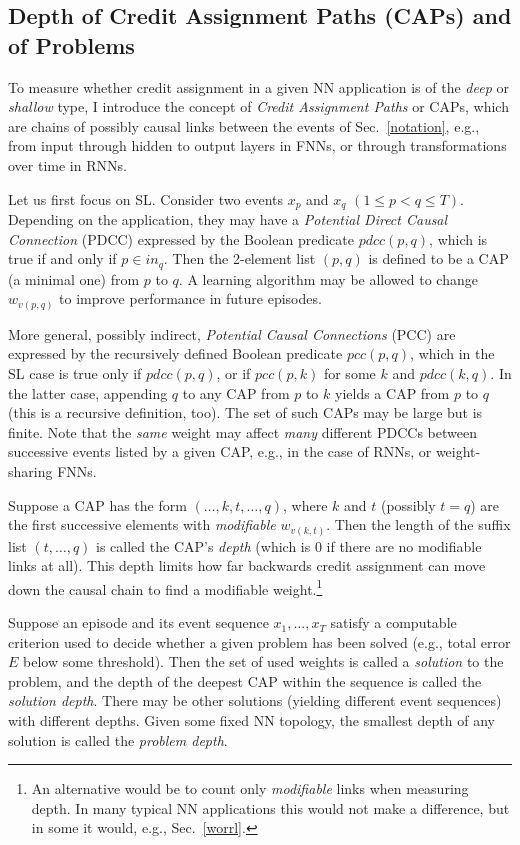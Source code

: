 \documentclass[letterpaper]{article}
\begin{document}
\begin{CJK*}{UTF8}{gbsn}


\section{Depth of Credit Assignment Paths (CAPs) and of Problems}
\label{caps}

To measure whether credit assignment in a given 
NN application is of the {\em deep} or {\em shallow} type,
I introduce the concept of {\em Credit Assignment Paths} or CAPs,
which are chains of possibly causal links between the events of Sec.~\ref{notation},
e.g., from input through hidden to output layers in FNNs, or through 
transformations over time in RNNs. 

Let us first focus on SL.
Consider two events 
$x_p$ and $x_q$ $(1 \leq p < q \leq T)$.
Depending on the application, they may have a
{\em Potential Direct Causal Connection} (PDCC) expressed by the Boolean
predicate $pdcc(p,q)$, which
is true if and only if $p \in in_q$.
Then the 2-element list $(p,q)$ is defined to be a CAP (a minimal one) from $p$ to $q$.
A learning algorithm may be allowed to change  $w_{v(p,q)}$ to improve performance
in future episodes.

More general, possibly indirect,
{\em Potential Causal Connections} (PCC) are expressed by the 
recursively defined Boolean
predicate $pcc(p,q)$, which in the SL case 
is true only if $pdcc(p,q)$, or if
$pcc(p,k)$ for some $k$ and $pdcc(k,q)$.
In the latter case,
appending $q$ to any CAP from $p$ to $k$ yields a CAP from $p$ to $q$
 (this is a recursive definition, too).
The set of such CAPs may be large but is finite. 
Note that the {\em same} weight may affect {\em many} different PDCCs
between successive events listed by a given CAP, 
e.g., in the case of RNNs, or weight-sharing FNNs.

Suppose a CAP has the form $(\ldots,k,t,\ldots,q)$, where
$k$ and $t$ (possibly $t=q$) are the first successive elements 
with {\em modifiable} $w_{v(k,t)}$. Then the 
length of the suffix list $(t,\ldots, q)$ is called the CAP's {\em depth}
(which is 0 if there are no modifiable links at all).
This depth limits how far backwards credit assignment 
can move down the causal chain 
to find a modifiable 
weight.\footnote{An alternative would be to count only {\em modifiable} links when measuring depth. In many 
typical NN applications this would not make a difference, but in some it would, e.g., Sec.~\ref{worrl}.}

Suppose an episode and its event sequence $x_1,\ldots,x_T$ satisfy a computable criterion 
used to decide whether a given problem has been solved 
(e.g., total error $E$ below some threshold). 
Then the set of used weights is called a {\em solution} to the problem, 
and the depth of the deepest CAP within the sequence is called the {\em solution depth}. 
There may be other solutions (yielding different event sequences) with different depths.
Given some fixed NN topology,
the  smallest depth of any solution is called the {\em problem depth}.




\end{CJK*}
\end{document}
